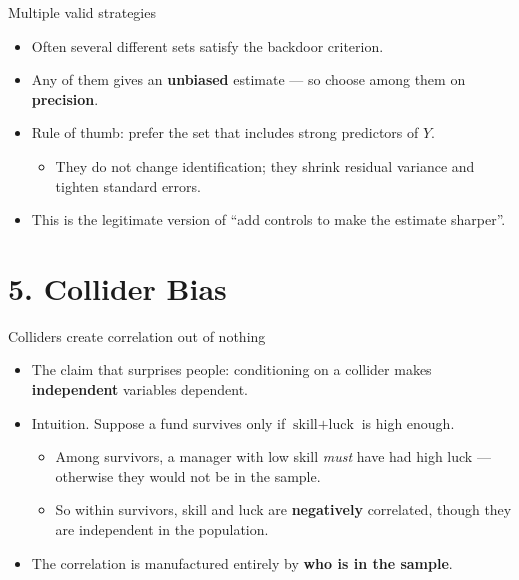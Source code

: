 \documentclass[
  11pt,
  ignorenonframetext,
  aspectratio=169,
]{beamer}
\providecommand{\tightlist}{%
  \setlength{\itemsep}{0pt}\setlength{\parskip}{0pt}}
\begin{document}
\begin{frame}{Multiple valid strategies}
\protect{}\label{multiple-valid-strategies}
\begin{itemize}
\tightlist
\item
  Often several different sets satisfy the backdoor criterion.
\item
  Any of them gives an \textbf{unbiased} estimate --- so choose among
  them on \textbf{precision}.
\item
  Rule of thumb: prefer the set that includes strong predictors of
  \(Y\).

  \begin{itemize}
  \tightlist
  \item
    They do not change identification; they shrink residual variance and
    tighten standard errors.
  \end{itemize}
\item
  This is the legitimate version of ``add controls to make the estimate
  sharper''.
\end{itemize}
\end{frame}

\section{5. Collider Bias}\label{collider-bias}

\begin{frame}{Colliders create correlation out of nothing}
\protect{}\label{colliders-create-correlation-out-of-nothing}
\begin{itemize}
\tightlist
\item
  The claim that surprises people: conditioning on a collider makes
  \textbf{independent} variables dependent.
\item
  Intuition. Suppose a fund survives only if
  \(\text{skill} + \text{luck}\) is high enough.

  \begin{itemize}
  \tightlist
  \item
    Among survivors, a manager with low skill \emph{must} have had high
    luck --- otherwise they would not be in the sample.
  \item
    So within survivors, skill and luck are \textbf{negatively}
    correlated, though they are independent in the population.
  \end{itemize}
\item
  The correlation is manufactured entirely by \textbf{who is in the
  sample}.
\end{itemize}
\end{frame}
\end{document}
